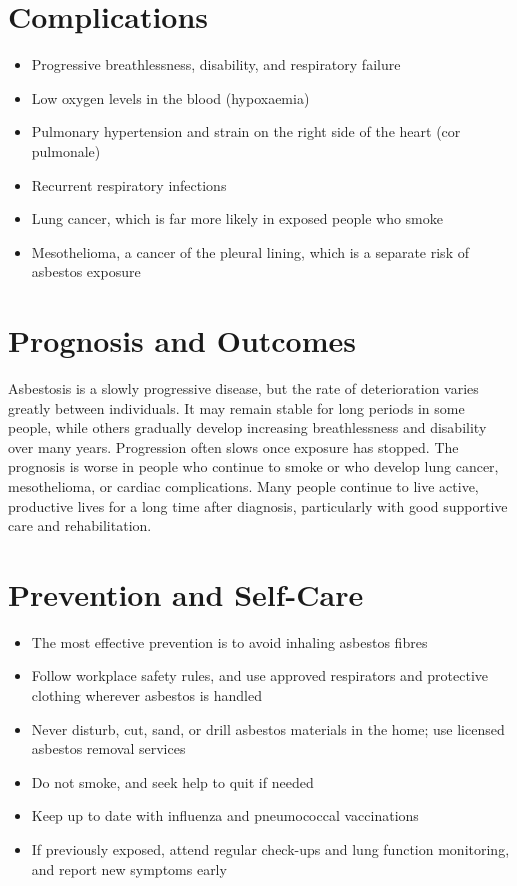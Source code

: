 \section*{Complications}
\begin{itemize}
    \item Progressive breathlessness, disability, and respiratory failure
    \item Low oxygen levels in the blood (hypoxaemia)
    \item Pulmonary hypertension and strain on the right side of the heart (cor pulmonale)
    \item Recurrent respiratory infections
    \item Lung cancer, which is far more likely in exposed people who smoke
    \item Mesothelioma, a cancer of the pleural lining, which is a separate risk of asbestos exposure
\end{itemize}

\section*{Prognosis and Outcomes}
Asbestosis is a slowly progressive disease, but the rate of deterioration varies greatly between individuals. It may remain stable for long periods in some people, while others gradually develop increasing breathlessness and disability over many years. Progression often slows once exposure has stopped. The prognosis is worse in people who continue to smoke or who develop lung cancer, mesothelioma, or cardiac complications. Many people continue to live active, productive lives for a long time after diagnosis, particularly with good supportive care and rehabilitation.

\section*{Prevention and Self-Care}
\begin{itemize}
    \item The most effective prevention is to avoid inhaling asbestos fibres
    \item Follow workplace safety rules, and use approved respirators and protective clothing wherever asbestos is handled
    \item Never disturb, cut, sand, or drill asbestos materials in the home; use licensed asbestos removal services
    \item Do not smoke, and seek help to quit if needed
    \item Keep up to date with influenza and pneumococcal vaccinations
    \item If previously exposed, attend regular check-ups and lung function monitoring, and report new symptoms early
\end{itemize}

